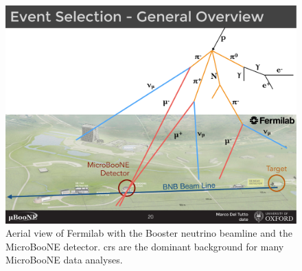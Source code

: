 \begin{figure}[t]
\centering
\includegraphics[width=1.0\textwidth]{images/MicroBooNE/sbn_cosmics}
\caption[Aerial View of Fermilab with Cosmic Rays]{Aerial view of Fermilab with the Booster neutrino beamline and the MicroBooNE detector. \acrshort{cr}s are the dominant background for many MicroBooNE data analyses.}
\label{fig:sbn_cosmics}
\end{figure}

